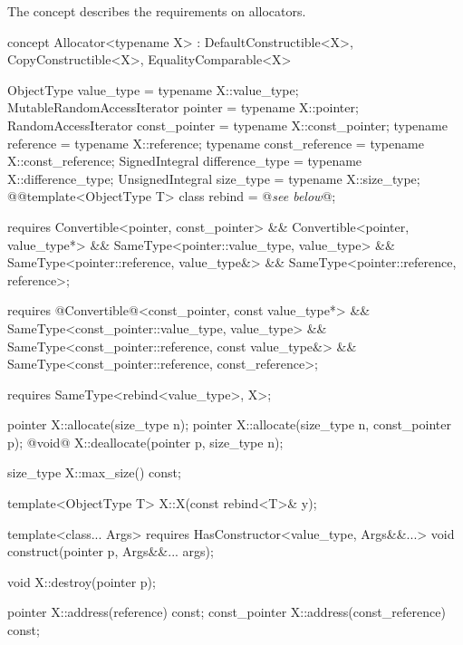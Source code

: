 \documentclass[american,twoside]{book}
\begin{document}

\pnum
{}
{The \mbox{} concept describes the requirements on
  allocators.} 

\color{addclr}
\begin{itemdecl}
concept Allocator<typename X> : DefaultConstructible<X>, CopyConstructible<X>, EqualityComparable<X> {
  ObjectType value_type               = typename X::value_type;
  MutableRandomAccessIterator pointer = typename X::pointer;
  RandomAccessIterator const_pointer  = typename X::const_pointer;
  typename reference                  = typename X::reference;
  typename const_reference            = typename X::const_reference;
  SignedIntegral difference_type      = typename X::difference_type;
  UnsignedIntegral size_type          = typename X::size_type; 
  @\textcolor{addclr}{}@template<ObjectType T> class rebind = @\textit{see below}@;

  requires Convertible<pointer, const_pointer> && 
           Convertible<pointer, value_type*> &&
           SameType<pointer::value_type, value_type> &&
           SameType<pointer::reference, value_type&> &&
           SameType<pointer::reference, reference>;

  requires @\textcolor{addclr}{Convertible}@<const_pointer, const value_type*> && 
           SameType<const_pointer::value_type, value_type> &&
           SameType<const_pointer::reference, const value_type&> &&
           SameType<const_pointer::reference, const_reference>;
 
  requires SameType<rebind<value_type>, X>;

  pointer X::allocate(size_type n);
  pointer X::allocate(size_type n, const_pointer p);
  @\textcolor{addclr}{void}@ X::deallocate(pointer p, size_type n);

  size_type X::max_size() const;

  template<ObjectType T>
    X::X(const rebind<T>& y);

  template<class... Args>
    requires HasConstructor<value_type, Args&&...>
    void construct(pointer p, Args&&... args);

  void X::destroy(pointer p);

  pointer X::address(reference) const;
  const_pointer X::address(const_reference) const;
}
\end{itemdecl}
\color{black}
\end{document}
